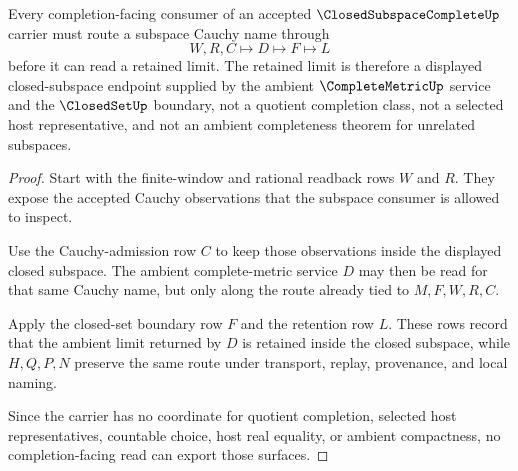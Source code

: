 \begin{theorem}
\label{thm:closed-subspace-complete-cauchy-limit-retention}
Every completion-facing consumer of an accepted $\ClosedSubspaceCompleteUp$ carrier must route a subspace Cauchy name through
$$
W,R,C \longmapsto D \longmapsto F \longmapsto L
$$
before it can read a retained limit. The retained limit is therefore a displayed closed-subspace endpoint supplied by the ambient $\CompleteMetricUp$ service and the $\ClosedSetUp$ boundary, not a quotient completion class, not a selected host representative, and not an ambient completeness theorem for unrelated subspaces.
\end{theorem}
\begin{proof}
Start with the finite-window and rational readback rows $W$ and $R$. They expose the accepted Cauchy observations that the subspace consumer is allowed to inspect.

Use the Cauchy-admission row $C$ to keep those observations inside the displayed closed subspace. The ambient complete-metric service $D$ may then be read for that same Cauchy name, but only along the route already tied to $M,F,W,R,C$.

Apply the closed-set boundary row $F$ and the retention row $L$. These rows record that the ambient limit returned by $D$ is retained inside the closed subspace, while $H,Q,P,N$ preserve the same route under transport, replay, provenance, and local naming.

Since the carrier has no coordinate for quotient completion, selected host representatives, countable choice, host real equality, or ambient compactness, no completion-facing read can export those surfaces.
\end{proof}


\begin{closurestatus}{\ClosedSubspaceCompleteUp}
  \theoryclosure{\seedClosure}
  \formalstatus{\formalTargetV}
\end{closurestatus}
